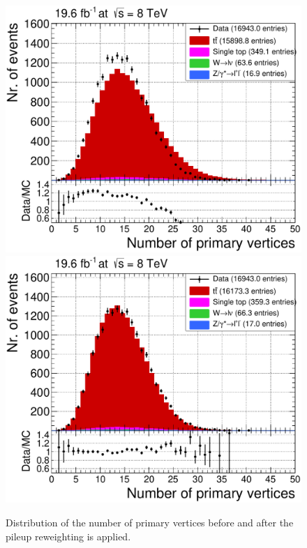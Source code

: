 \begin{figure}[h!t]
 \centering
 \includegraphics[width = 0.45 \textwidth]{Chapters/Chapter4_EvtSel/Figures/nPV_AllCuts_noPU_mu_Stack.pdf}
 \includegraphics[width = 0.45 \textwidth]{Chapters/Chapter4_EvtSel/Figures/nPV_AllCuts_mu_Stack.pdf}
 \caption{Distribution of the number of primary vertices before and after the pileup reweighting is applied.} \label{fig::PUInfl}
\end{figure}

